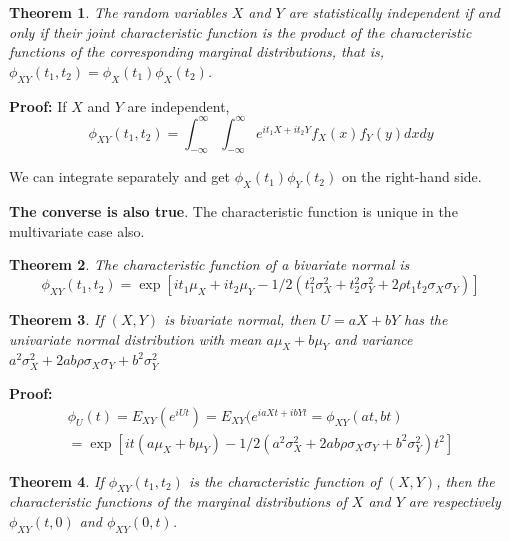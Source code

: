 \documentclass{article}
\newtheorem{theorem}{Theorem}[section]
\begin{document}
\begin{theorem}
    The random variables \(X\) and \(Y\) are statistically independent if and only if their joint characteristic function is the product of the characteristic functions of the corresponding marginal distributions, that is, \(\phi_{XY}(t_1,t_2)=\phi_X(t_1)\phi_X(t_2)\).
\end{theorem}

\textbf{Proof:} If \(X\) and \(Y\) are independent,
\begin{equation*}
    \phi_{XY}(t_1,t_2)= \int_{-\infty}^{\infty} \int_{-\infty}^{\infty} e^{i t_1 X+i t_2 Y} f_X(x) f_Y(y) dxdy
\end{equation*}

We can integrate separately and get \(\phi_X(t_1)\phi_Y(t_2)\) on the right-hand side. 

\textbf{The converse is also true}. The characteristic function is unique in the multivariate case also.

\begin{theorem}
    The characteristic function of a bivariate normal is
    \begin{equation*}
        \phi_{XY}(t_1,t_2) =\exp{[it_1\mu_X+it_2\mu_Y-1/2(t_1^2\sigma_X^2+t_2^2\sigma_Y^2+2 \rho t_1 t_2 \sigma_X \sigma_Y)]}
    \end{equation*}
\end{theorem}

\begin{theorem}
    If \((X,Y)\) is bivariate normal, then \(U=aX+bY\) has the univariate normal distribution with mean \(a\mu_X+b\mu_Y\) and variance \(a^2\sigma_X^2+2ab\rho\sigma_X\sigma_Y+b^2\sigma_Y^2\)
\end{theorem}

\textbf{Proof:} \begin{equation*}
\begin{split}
    \phi_U(t)=E_{XY}(e^{iUt})=E_{XY}(e^{iaXt+ibYt}=\phi_{XY}(at,bt) \\
    = \exp{[it(a\mu_X+b\mu_Y)-1/2(a^2\sigma_X^2+2ab\rho \sigma_X \sigma_Y+b^2\sigma_Y^2)t^2]}
\end{split}
\end{equation*} 

\begin{theorem}
    If \(\phi_{XY}(t_1,t_2)\) is the characteristic function of \((X,Y)\), then the characteristic functions of the marginal distributions of \(X\) and \(Y\) are respectively \(\phi_{XY}(t,0)\) and \(\phi_{XY}(0,t)\).
\end{theorem}
\end{document}
